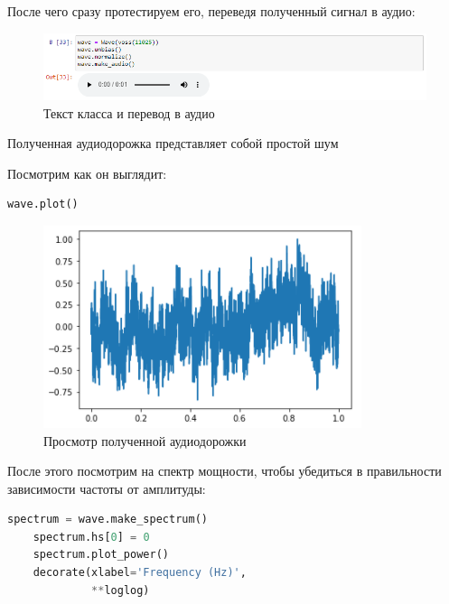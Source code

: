 \documentclass[a4paper]{article}
\begin{document}
            После чего сразу протестируем его, переведя полученный сигнал в аудио:
            
             \begin{figure}[H]
                \centering
                \includegraphics[width=\textwidth]{ex_5_wave_audio.png}
                \caption{Текст класса и перевод в аудио}
                \label{fig:ex_5_wave_audio}
            \end{figure}
            
            Полученная аудиодорожка представляет собой простой шум
            
            Посмотрим как он выглядит:
            
\begin{lstlisting}[language=Python, caption= Просмотр полученной аудиодорожки]
   wave.plot()
\end{lstlisting}               
            
            \begin{figure}[H]
                \centering
                \includegraphics{ex_5_wave_plot.png}
                \caption{Просмотр полученной аудиодорожки}
                \label{fig:ex_5_wave_plot}
            \end{figure}
            
            После этого посмотрим на спектр мощности, чтобы убедиться в правильности зависимости частоты от амплитуды:
            
\begin{lstlisting}[language=Python, caption= Получения спектра мощности]
  spectrum = wave.make_spectrum()
    spectrum.hs[0] = 0
    spectrum.plot_power()
    decorate(xlabel='Frequency (Hz)',
             **loglog)
\end{lstlisting}               
            
\end{document}
